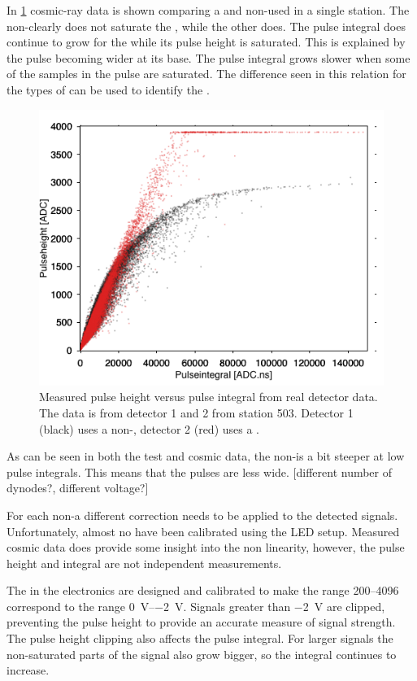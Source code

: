 In \cref{fig:ph_pi_503} cosmic-ray data is shown comparing a \nikhef and non-\nikhef \pmt used in a single station. The non-\nikhef \pmt clearly does not saturate the \adcs, while the other does. The pulse integral does continue to grow for the \nikhef \pmt while its pulse height is saturated. This is explained by the pulse becoming wider at its base. The pulse integral grows slower when some of the samples in the pulse are saturated. The difference seen in this relation for the types of \pmts can be used to identify the \pmt.

\begin{figure}
    \centering
    \includegraphics[width=.7\textwidth]{plots/detector/ph_pi_503.png}
    \caption{Measured pulse height versus pulse integral from real detector data. The data is from detector 1 and 2 from station 503. Detector 1 (black) uses a non-\nikhef \pmt, detector 2 (red) uses a \nikhef \pmt.}
    \label{fig:ph_pi_503}
\end{figure}

As can be seen in both the test and cosmic data, the non-\nikhef \pmt is a bit steeper at low pulse integrals. This means that the pulses are less wide. [different number of dynodes?, different voltage?]

For each non-\nikhef \pmt a different correction needs to be applied to the detected signals. Unfortunately, almost no \pmts have been calibrated using the LED setup. Measured cosmic data does provide some insight into the non linearity, however, the pulse height and integral are not independent measurements.

The \adcs in the \hisparc electronics are designed and calibrated to make the range \SIrange{200}{4096}{\adc} correspond to the range \SIrange{0}{-2}{\volt}. Signals greater than \SI{-2}{\volt} are clipped, preventing the pulse height to provide an accurate measure of signal strength. The pulse height clipping also affects the pulse integral. For larger signals the non-saturated parts of the signal also grow bigger, so the integral continues to increase.

